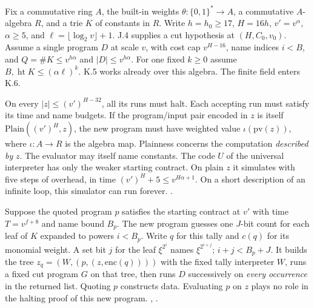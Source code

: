 \clearpage
{}\label{sec:15k5}

Fix a commutative ring $A$, the built-in weights $\theta:\{0,1\}^*\to A$, a commutative $A$-algebra $R$, and a trie $K$ of constants in $R$. Write $h=h_0\ge17$, $H=16h$, $v'=v^\alpha$, $\alpha\ge5$, and $\ell=\lfloor\log_2 v\rfloor+1$. J.4 supplies a cut hypothesis at $(H,C_0,v_0)$. Assume a single program $D$ at scale $v$, with cost cap $v^{H-16}$, name indices $i<B$, and $Q=\#K\le v^{h\alpha}$ and $|D|\le v^{h\alpha}$. For one fixed $k\ge0$ assume $B,\operatorname{ht}K\le(\alpha\ell)^k$. K.5 works already over this algebra. The finite field enters K.6.

On every $|z|\le(v')^{H-32}$, all its runs must halt. Each accepting run must satisfy its time and name budgets. If the program/input pair encoded in $z$ is itself $\mathrm{Plain}((v')^H,z)$, the new program must have weighted value $\iota(\mathrm{pv}(z))$, where $\iota:A\to R$ is the algebra map. Plainness concerns the computation \emph{described by} $z$. The evaluator may itself name constants. The code $U$ of the universal interpreter has only the weaker starting contract. On plain $z$ it simulates with five steps of overhead, in time $(v')^H+5\le v^{H\alpha+1}$. On a short description of an infinite loop, this simulator can run forever. .

Suppose the quoted program $p$ satisfies the starting contract at $v'$ with time $T=v^{f+8}$ and name bound $B_p$. The new program guesses one $J$-bit count for each leaf of $K$ expanded to powers $i<B_p$. Write $q$ for this tally and $c(q)$ for its monomial weight. A set bit $j$ for the leaf $\xi^{2^i}$ names $\xi^{2^{i+j}}$; $i+j<B_p+J$. It builds the tree $z_q=(W,(p,(z,\mathrm{enc}(q))))$ with the fixed tally interpreter $W$, runs a fixed cut program $G$ on that tree, then runs $D$ successively on \emph{every occurrence} in the returned list. Quoting $p$ constructs data. Evaluating $p$ on $z$ plays no role in the halting proof of this new program. , .

\clearpage
{}

